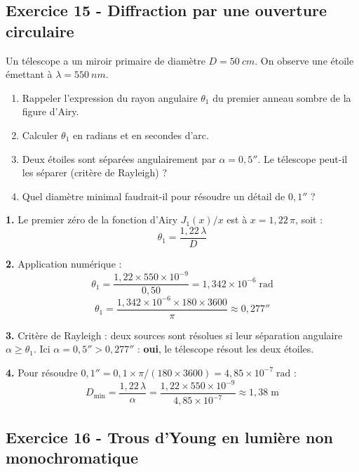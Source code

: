 \documentclass[12pt,a4paper]{article}
\begin{document}
\subsection*{Exercice 15 - Diffraction par une ouverture circulaire \niveau{\difficile}}

\begin{boiteexercice}
Un télescope a un miroir primaire de diamètre $D = \qty{50}{cm}$. On observe une étoile émettant à $\lambda = \qty{550}{nm}$.
\begin{enumerate}
  \item Rappeler l'expression du rayon angulaire $\theta_1$ du premier anneau sombre de la figure d'Airy.
  \item Calculer $\theta_1$ en radians et en secondes d'arc.
  \item Deux étoiles sont séparées angulairement par $\alpha = 0{,}5''$. Le télescope peut-il les séparer (critère de Rayleigh) ?
  \item Quel diamètre minimal faudrait-il pour résoudre un détail de $0{,}1''$ ?
\end{enumerate}
\end{boiteexercice}

\begin{boitecorrige}
\textbf{1.} Le premier zéro de la fonction d'Airy $J_1(x)/x$ est à $x = 1{,}22\,\pi$, soit :
\[
\theta_1 = \frac{1{,}22\,\lambda}{D}
\]

\textbf{2.} Application numérique :
\[
\theta_1 = \frac{1{,}22\times 550\times10^{-9}}{0{,}50} = 1{,}342\times10^{-6}\;\text{rad}
\]
\[
\theta_1 = \frac{1{,}342\times10^{-6}\times 180\times 3600}{\pi} \approx 0{,}277''
\]

\textbf{3.} Critère de Rayleigh : deux sources sont résolues si leur séparation angulaire $\alpha \geq \theta_1$. Ici $\alpha = 0{,}5'' > 0{,}277''$ : \textbf{oui}, le télescope résout les deux étoiles.

\textbf{4.} Pour résoudre $0{,}1'' = 0{,}1\times\pi/(180\times 3600) = 4{,}85\times10^{-7}\;\text{rad}$ :
\[
D_\text{min} = \frac{1{,}22\,\lambda}{\alpha} = \frac{1{,}22\times 550\times10^{-9}}{4{,}85\times10^{-7}} \approx 1{,}38\;\text{m}
\]
\end{boitecorrige}

\subsection*{Exercice 16 - Trous d'Young en lumière non monochromatique \niveau{\difficile}}
\end{document}
